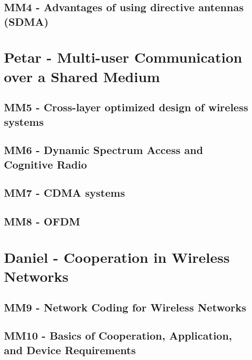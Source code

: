 \chapter{MM4 - Advantages of using directive antennas (SDMA)}





\part{Petar - Multi-user Communication over a Shared Medium}
\chapter{MM5 - Cross-layer optimized design of wireless systems}






\chapter{MM6 - Dynamic Spectrum Access and Cognitive Radio}


\chapter{MM7 - CDMA systems}



\chapter{MM8 - OFDM}


\part{Daniel - Cooperation in Wireless Networks }
\chapter{MM9 - Network Coding for Wireless Networks}





\chapter{MM10 - Basics of Cooperation, Application, and Device Requirements}





